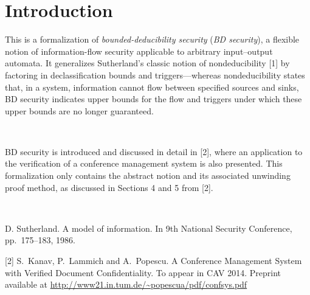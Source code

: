 
\section{Introduction}

This is a formalization of {\em bounded-deducibility security} ({\em BD security}), 
a flexible notion of information-flow security applicable to arbitrary input--output automata.  
It generalizes Sutherland's classic notion of 
nondeducibility [1] by factoring in declassification bounds and triggers---whereas nondeducibility 
states that, in a system, information cannot flow between specified sources and sinks, 
BD security indicates upper bounds for the flow and triggers under which these upper bounds 
are no longer guaranteed.  

\par \ \par
BD security is introduced and discussed in detail in [2], where an application to the verification of a conference management 
system is also presented. This formalization only contains the abstract notion and its associated unwinding proof method, 
as discussed in Sections 4 and 5 from [2].    


\par \ \par
[1] D. Sutherland. A model of information. In 9th National Security Conference, pp.\ 175--183, 1986.

[2]  S.\ Kanav, P.\ Lammich and A.\ Popescu.  
A Conference Management System with Verified Document Confidentiality. To appear in CAV 2014.  
Preprint available at \url{http://www21.in.tum.de/~popescua/pdf/confsys.pdf}

